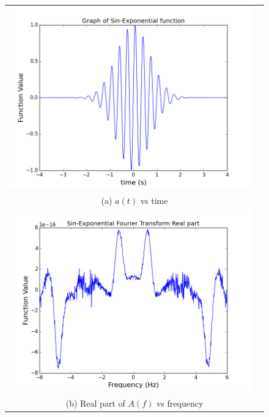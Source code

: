 \documentclass[11pt]{article}
\begin{document}
\begin{figure}[H]
\centering
\begin{tabular}{cc}
\includegraphics[scale=.4]{sin_wavepacket.png} \\
\multicolumn{2}{c}{(a) $a(t)$ vs time} \\[6pt]

\includegraphics[scale=.4]{sin_fourReal.png}\\
\multicolumn{2}{c}{(b) Real part of $A(f)$ vs frequency} \\[6pt]


\end{tabular}
\end{figure}
\end{document}
